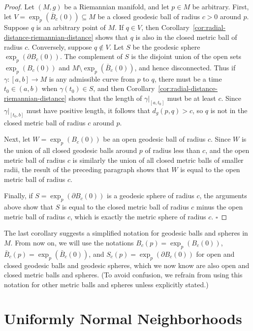 \begin{proof}
Let $(M, g)$ be a Riemannian manifold, and let $p \in M$ be arbitrary. First, let $V = \exp_p(\bar{B}_c(0)) \subseteq M$ be a closed geodesic ball of radius $c > 0$ around $p$. Suppose $q$ is an arbitrary point of $M$. If $q \in V$, then Corollary~\ref{cor:radial-distance-riemannian-distance} shows that $q$ is also in the closed metric ball of radius $c$. Conversely, suppose $q \notin V$. Let $S$ be the geodesic sphere $\exp_p(\partial B_c(0))$. The complement of $S$ is the disjoint union of the open sets $\exp_p(B_c(0))$ and $M \setminus \exp_p(\bar{B}_c(0))$, and hence disconnected. Thus if $\gamma : [a,b] \to M$ is any admissible curve from $p$ to $q$, there must be a time $t_0 \in (a,b)$ when $\gamma(t_0) \in S$, and then Corollary~\ref{cor:radial-distance-riemannian-distance} shows that the length of $\gamma|_{[a,t_0]}$ must be at least $c$. Since $\gamma|_{[t_0,b]}$ must have positive length, it follows that $d_g(p,q) > c$, so $q$ is not in the closed metric ball of radius $c$ around $p$.

Next, let $W = \exp_p(B_c(0))$ be an open geodesic ball of radius $c$. Since $W$ is the union of all closed geodesic balls around $p$ of radius less than $c$, and the open metric ball of radius $c$ is similarly the union of all closed metric balls of smaller radii, the result of the preceding paragraph shows that $W$ is equal to the open metric ball of radius $c$.

Finally, if $S = \exp_p(\partial B_c(0))$ is a geodesic sphere of radius $c$, the arguments above show that $S$ is equal to the closed metric ball of radius $c$ minus the open metric ball of radius $c$, which is exactly the metric sphere of radius $c$. $\square$
\end{proof}

The last corollary suggests a simplified notation for geodesic balls and spheres in $M$. From now on, we will use the notations $B_c(p) = \exp_p(B_c(0))$, $\bar{B}_c(p) = \exp_p(\bar{B}_c(0))$, and $S_c(p) = \exp_p(\partial B_c(0))$ for open and closed geodesic balls and geodesic spheres, which we now know are also open and closed metric balls and spheres. (To avoid confusion, we refrain from using this notation for other metric balls and spheres unless explicitly stated.)

\section{Uniformly Normal Neighborhoods}

